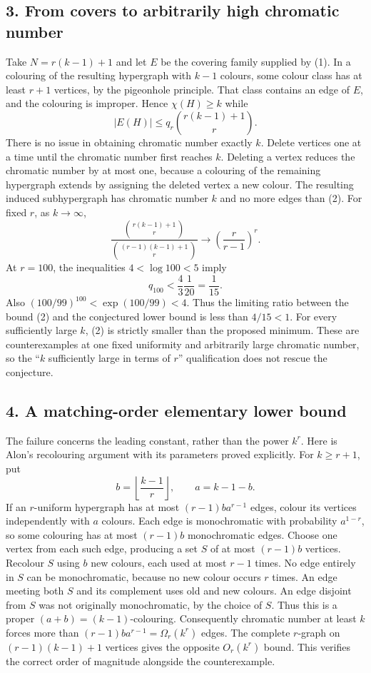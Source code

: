 \subsection*{3. From covers to arbitrarily high chromatic number}
Take $N=r(k-1)+1$ and let $E$ be the covering family supplied by (1). In a colouring of the resulting hypergraph with $k-1$ colours, some colour class has at least $r+1$ vertices, by the pigeonhole principle. That class contains an edge of $E$, and the colouring is improper. Hence $\chi(H)\ge k$ while
\[
 |E(H)|\le q_r\binom{r(k-1)+1}{r}.                         \tag{2}
\]
There is no issue in obtaining chromatic number exactly $k$. Delete vertices one at a time until the chromatic number first reaches $k$. Deleting a vertex reduces the chromatic number by at most one, because a colouring of the remaining hypergraph extends by assigning the deleted vertex a new colour. The resulting induced subhypergraph has chromatic number $k$ and no more edges than (2).
For fixed $r$, as $k\to\infty$,
\[
 \frac{\binom{r(k-1)+1}{r}}
 {\binom{(r-1)(k-1)+1}{r}}
 \longrightarrow\left(\frac r{r-1}\right)^r.              \tag{3}
\]
At $r=100$, the inequalities $4<\log100<5$ imply
\[
 q_{100}<\frac{4}{3}\frac1{20}=\frac1{15}.
\]
Also $(100/99)^{100}<\exp(100/99)<4$. Thus the limiting ratio between the bound (2) and the conjectured lower bound is less than $4/15<1$. For every sufficiently large $k$, (2) is strictly smaller than the proposed minimum. These are counterexamples at one fixed uniformity and arbitrarily large chromatic number, so the ``$k$ sufficiently large in terms of $r$'' qualification does not rescue the conjecture.
\subsection*{4. A matching-order elementary lower bound}
The failure concerns the leading constant, rather than the power $k^r$. Here is Alon's recolouring argument with its parameters proved explicitly. For $k\ge r+1$, put
\[
 b=\left\lfloor\frac{k-1}{r}\right\rfloor,\qquad a=k-1-b.
\]
If an $r$-uniform hypergraph has at most $(r-1)b a^{r-1}$ edges, colour its vertices independently with $a$ colours. Each edge is monochromatic with probability $a^{1-r}$, so some colouring has at most $(r-1)b$ monochromatic edges. Choose one vertex from each such edge, producing a set $S$ of at most $(r-1)b$ vertices. Recolour $S$ using $b$ new colours, each used at most $r-1$ times.
No edge entirely in $S$ can be monochromatic, because no new colour occurs $r$ times. An edge meeting both $S$ and its complement uses old and new colours. An edge disjoint from $S$ was not originally monochromatic, by the choice of $S$. Thus this is a proper $(a+b)=(k-1)$-colouring.
Consequently chromatic number at least $k$ forces more than $(r-1)b a^{r-1}=\Omega_r(k^r)$ edges. The complete $r$-graph on $(r-1)(k-1)+1$ vertices gives the opposite $O_r(k^r)$ bound. This verifies the correct order of magnitude alongside the counterexample.
